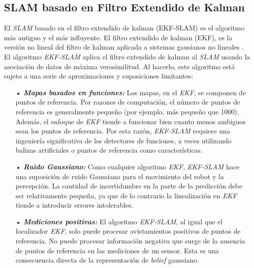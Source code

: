 \subsection{SLAM basado en Filtro Extendido de Kalman}
El \textit{SLAM} basado en el filtro extendido de kalman (EKF-SLAM) es el algoritmo 
m\'as antiguo y el m\'as influyente. El filtro extendido de kalman (EKF), es la versión 
no lineal del filtro de kalman aplicada a sistemas gausianos no lineales \cite{Thrun2005}.
El algoritmo \textit{EKF-SLAM} aplica el filtro extendido de kalman al \textit{SLAM} 
usando la asociaci\'on de datos de m\'axima verosimilitud. Al hacerlo, este algoritmo
est\'a sujeto a una serie de aproximaciones y suposiciones limitantes:
\begin{itemize}
	\item[•] \textit{\textbf{Mapas basados en funciones:}} Los mapas, en el \textit{EKF}, se 
  componen de puntos de referencia. Por razones de computaci\'on, el n\'umero de puntos de 
  referencia es generalmente peque\~no (por ejemplo, m\'as peque\~no que 1000). Adem\'as, el 
  enfoque de \textit{EKF} tiende a funcionar bien cuanto menos ambiguos sean los puntos
  de referencia. Por esta raz\'on, \textit{EKF-SLAM} requiere una ingenier\'ia significativa 
  de los detectores de funciones, a veces utilizando balizas artificiales o puntos de 
  referencia como caracter\'isticas.
	\item[•] \textit{\textbf{Ruido Gaussiano:}} Como cualquier algoritmo \textit{EKF}, 
  \textit{EKF-SLAM} hace una suposici\'on de ruido Gaussiano para el movimiento del robot y 
  la percepci\'on. La cantidad de incertidumbre en la parte de la predicci\'on debe ser 
  relativamente peque\~na, ya que de lo contrario la linealizaci\'on en \textit{EKF} tiende 
  a introducir errores intolerables.
	\item[•] \textit{\textbf{Mediciones positivas:}} El algoritmo \textit{EKF-SLAM}, al igual 
	que el localizador \textit{EKF}, solo puede procesar avistamientos positivos de puntos 
  de referencia. No puede procesar informaci\'on negativa que surge de la ausencia de puntos 
  de referencia en las mediciones de un sensor. Esta es una consecuencia directa de la 
  representaci\'on de \textit{belief} gaussiano.
\end{itemize}

